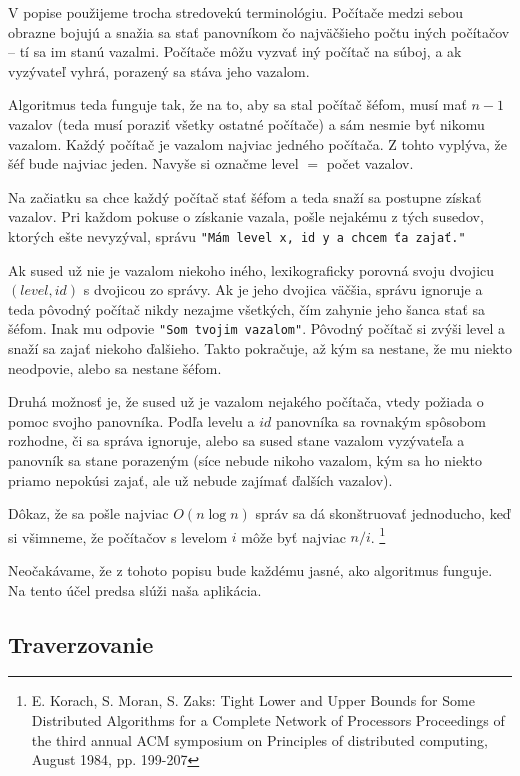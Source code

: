 V popise použijeme trocha stredovekú terminológiu. Počítače medzi sebou obrazne bojujú a snažia
sa stať panovníkom čo najväčšieho počtu iných počítačov -- tí sa im stanú vazalmi. 
Počítače môžu vyzvať iný počítač na súboj, a ak vyzývateľ vyhrá, porazený sa stáva jeho vazalom.

Algoritmus teda funguje tak, že na to, aby sa stal počítač šéfom, musí mať $n-1$ vazalov (teda musí
poraziť všetky ostatné počítače) a sám nesmie byť nikomu vazalom. Každý počítač je vazalom najviac 
jedného počítača. Z tohto vyplýva, že šéf bude najviac jeden. Navyše si označme level $=$ počet vazalov.

Na začiatku sa chce každý počítač stať šéfom a teda snaží sa postupne získať vazalov. Pri každom
pokuse o získanie vazala, pošle nejakému z tých susedov, ktorých ešte nevyzýval, správu \verb!"Mám level x, id y a chcem ťa zajať."! 

Ak sused už nie je vazalom niekoho iného, lexikograficky porovná svoju dvojicu $(level, id)$ s
dvojicou zo správy. 
Ak je jeho dvojica väčšia, správu ignoruje a teda pôvodný počítač nikdy nezajme všetkých, čím
zahynie jeho šanca stať sa šéfom. 
Inak mu odpovie \verb!"Som tvojim vazalom"!. Pôvodný počítač si zvýši level a snaží sa zajať niekoho
ďalšieho. Takto pokračuje, až kým sa nestane, že mu niekto neodpovie, alebo sa nestane šéfom.

Druhá možnosť je, že sused už je vazalom nejakého počítača, vtedy požiada o pomoc svojho panovníka.
Podľa levelu a $id$ panovníka sa rovnakým spôsobom rozhodne, či sa správa ignoruje, alebo 
sa sused stane vazalom vyzývateľa a panovník sa stane porazeným (síce nebude nikoho vazalom, kým sa
ho niekto priamo nepokúsi zajať, ale už nebude zajímať ďalších vazalov).

Dôkaz, že sa pošle najviac $O(n\log n)$ správ sa dá skonštruovať jednoducho, keď si všimneme, 
že počítačov s levelom $i$ môže byť najviac $n/i$.
\footnote{E. Korach, S. Moran, S. Zaks: Tight Lower and Upper Bounds for Some Distributed Algorithms
for a Complete Network of Processors Proceedings of the third annual ACM symposium on Principles of
distributed computing, August 1984, pp. 199-207}
 
Neočakávame, že z tohoto popisu bude každému jasné, ako algoritmus funguje. Na tento účel predsa
slúži naša aplikácia.

\subsection{Traverzovanie}

